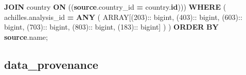 \documentclass[
]{book}
\newenvironment{Shaded}{\begin{snugshade}}{\end{snugshade}}
\newcommand{\DataTypeTok}[1]{\textcolor[rgb]{0.13,0.29,0.53}{#1}}
\newcommand{\DecValTok}[1]{\textcolor[rgb]{0.00,0.00,0.81}{#1}}
\newcommand{\KeywordTok}[1]{\textcolor[rgb]{0.13,0.29,0.53}{\textbf{#1}}}
\newcommand{\NormalTok}[1]{#1}
\newcommand{\OperatorTok}[1]{\textcolor[rgb]{0.81,0.36,0.00}{\textbf{#1}}}
\begin{document}
\begin{Shaded}
\begin{Highlighting}[]
    \KeywordTok{JOIN}\NormalTok{ country }\KeywordTok{ON}\NormalTok{ ((}\KeywordTok{source}\NormalTok{.country\_id }\OperatorTok{=}\NormalTok{ country.}\KeywordTok{id}\NormalTok{)))}
 \KeywordTok{WHERE}
\NormalTok{   (}
\NormalTok{     achilles.analysis\_id }\OperatorTok{=} \KeywordTok{ANY}\NormalTok{ (}
       \DataTypeTok{ARRAY}\NormalTok{[(}\DecValTok{203}\NormalTok{):: bigint,}
\NormalTok{       (}\DecValTok{403}\NormalTok{):: bigint,}
\NormalTok{       (}\DecValTok{603}\NormalTok{):: bigint,}
\NormalTok{       (}\DecValTok{703}\NormalTok{):: bigint,}
\NormalTok{       (}\DecValTok{803}\NormalTok{):: bigint,}
\NormalTok{       (}\DecValTok{183}\NormalTok{):: bigint]}
\NormalTok{     )}
\NormalTok{   )}
 \KeywordTok{ORDER} \KeywordTok{BY} \KeywordTok{source}\NormalTok{.name;}
\end{Highlighting}
\end{Shaded}

\hypertarget{data_provenance}{%
\subsection*{data\_provenance}\label{data_provenance}}
\end{document}
